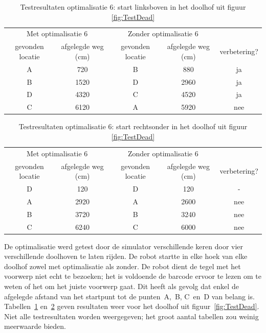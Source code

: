 \documentclass[eind]{penoverslag}
\begin{document}
\begin{table}[h]
\begin{center}
    \begin{tabular}{ c | c | c | c | c}
   \multicolumn{2}{c|}{Met optimalisatie 6} & \multicolumn{2}{|c|}{Zonder optimalisatie 6} & \\
     gevonden locatie & afgelegde weg (cm) & gevonden locatie &  afgelegde weg (cm) & verbetering?\\ \hline\hline
    A & 720 & B & 880 & ja \\ \hline
    B & 1520 & D & 2960 & ja \\ \hline
    D & 4320 & C & 4520 & ja\\ \hline
    C & 6120 & A & 5920 & nee\\
    \end{tabular}
    \caption{Testresultaten optimalisatie 6: start linksboven in het doolhof uit figuur \ref{fig:TestDead}}
    \label{tab:resultVerken1}
\end{center}
\end{table}

\begin{table}[h]
\begin{center}
    \begin{tabular}{c | c | c | c | c}
   \multicolumn{2}{c|}{Met optimalisatie 6} & \multicolumn{2}{|c|}{Zonder optimalisatie 6} &\\
     gevonden locatie &  afgelegde weg (cm) & gevonden locatie &  afgelegde weg (cm)& verbetering?\\ \hline\hline
    D & 120 & D & 120 & -\\ \hline
    A & 2920 & A & 2600 & nee\\ \hline
    B & 3720 & B & 3240 & nee\\ \hline
    C & 6240 & C & 6000 & nee\\
    \end{tabular}
    \caption{Testresultaten optimalisatie 6: start rechtsonder in het doolhof uit figuur \ref{fig:TestDead}}
    \label{tab:resultVerken2}
\end{center}
\end{table}

De optimalisatie werd getest door de simulator verschillende keren door vier verschillende doolhoven te laten rijden. De robot startte in elke hoek van elke doolhof zowel met optimalisatie als zonder. De robot dient de tegel met het voorwerp niet echt te bezoeken; het is voldoende de barcode ervoor te lezen om te weten of het om het juiste voorwerp gaat. Dit heeft als gevolg dat enkel de afgelegde afstand van het startpunt tot de punten~A,~B, C~en~D van belang is. Tabellen~\ref{tab:resultVerken1} en~\ref{tab:resultVerken2} geven resultaten weer voor het doolhof uit figuur~\ref{fig:TestDead}. Niet alle testresultaten worden weergegeven; het groot aantal tabellen zou weinig meerwaarde bieden.\\
\end{document}
